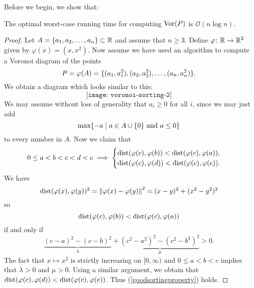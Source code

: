 Before we begin, we show that:
\newpage
\begin{thm} \label{thm:voronoicansort}
The optimal worst-case running time for computing $\operatorname{Vor}(P)$ is $\mathcal{O}(n \log n)$.
\end{thm}
\begin{proof}
Let $A = \{a_1, a_2, \ldots, a_n\} \subset \mathbb{R}$ and assume that $n \geq 3$. Define $\varphi \colon \mathbb{R} \to \mathbb{R}^2$ given by $\varphi(x) = (x, x^2)$. Now assume we have used an algorithm to compute a Voronoi diagram of the points
\[
    P = \varphi(A) = \{(a_1, a_1^2), (a_2, a_2^2), \ldots, (a_n, a_n^2)\}.
\]
We obtain a diagram which looks similar to this:
\[
    \texttt{[image: voronoi-sorting-2]}
\]
We may assume without loss of generality that $a_i \geq 0$ for all $i$, since we may just add
\[
    \max\{-a \mid a \in A \cup \{0\} \text{ and } a \leq 0\}
\]
to every number in $A$. Now we claim that
\begin{equation} \label{goodsortingproperty}
    0 \leq a < b < c < d < e
    \implies
    \begin{cases}
        \operatorname{dist}(\varphi(c), \varphi(b)) < \operatorname{dist}(\varphi(c), \varphi(a)), & \text{ } \\
        \operatorname{dist}(\varphi(c), \varphi(d)) < \operatorname{dist}(\varphi(c), \varphi(e)). & \text{ }
    \end{cases}
\end{equation}
We have
\[
    \operatorname{dist}(\varphi(x), \varphi(y))^2 = \left\lVert \varphi(x) - \varphi(y) \right\rVert^2 = (x - y)^2 + (x^2 - y^2)^2
\]
so
\[
    \operatorname{dist}(\varphi(c), \varphi(b)) < \operatorname{dist}(\varphi(c), \varphi(a))
\]
if and only if
\[
    \underbrace{(c - a)^2 - (c - b)^2}_{\lambda} + \underbrace{(c^2 - a^2)^2 - (c^2 - b^2)^2}_{\mu} > 0.
\]
The fact that $x \mapsto x^2$ is strictly increasing on $[0, \infty)$ and $0 \leq a < b < c$ implies that $\lambda > 0$ and $\mu > 0$. Using a similar argument, we obtain that $\operatorname{dist}(\varphi(c), \varphi(d)) < \operatorname{dist}(\varphi(c), \varphi(e))$. Thus (\ref{goodsortingproperty}) holds.


\end{proof}
